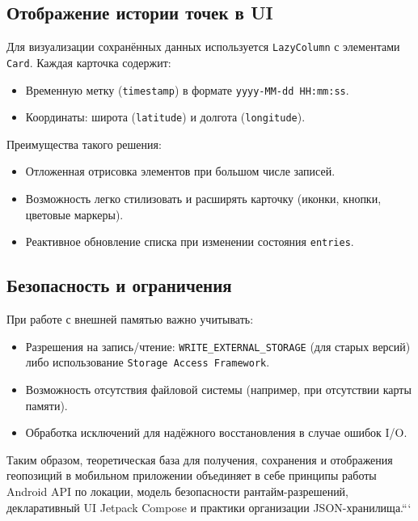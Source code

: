 \subsection*{Отображение истории точек в UI}
Для визуализации сохранённых данных используется \texttt{LazyColumn} с элементами \texttt{Card}. Каждая карточка содержит:
\begin{itemize}
    \item Временную метку (\texttt{timestamp}) в формате \texttt{yyyy-MM-dd HH:mm:ss}.
    \item Координаты: широта (\texttt{latitude}) и долгота (\texttt{longitude}).
\end{itemize}
Преимущества такого решения:
\begin{itemize}
    \item Отложенная отрисовка элементов при большом числе записей.
    \item Возможность легко стилизовать и расширять карточку (иконки, кнопки, цветовые маркеры).
    \item Реактивное обновление списка при изменении состояния \texttt{entries}.
\end{itemize}

\subsection*{Безопасность и ограничения}
При работе с внешней памятью важно учитывать:
\begin{itemize}
    \item Разрешения на запись/чтение: \texttt{WRITE\_EXTERNAL\_STORAGE} (для старых версий) либо использование \texttt{Storage Access Framework}.
    \item Возможность отсутствия файловой системы (например, при отсутствии карты памяти).
    \item Обработка исключений для надёжного восстановления в случае ошибок I/O.
\end{itemize}

Таким образом, теоретическая база для получения, сохранения и отображения геопозиций в мобильном приложении объединяет в себе принципы работы Android API по локации, модель безопасности рантайм-разрешений, декларативный UI Jetpack Compose и практики организации JSON-хранилища.```
